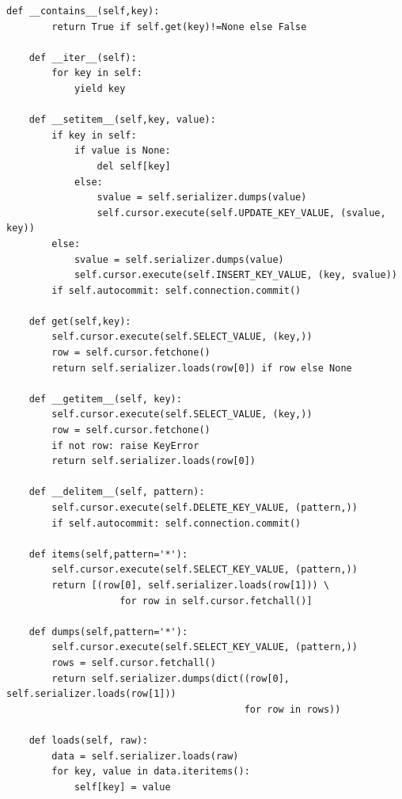 \documentclass[justified,sixbynine]{tufte-book}
\def\ft{\small\tt}
\theoremstyle{plain}%
\theoremstyle{definition}
\theoremstyle{remark}
\begin{document}
\begin{fullwidth}
\begin{lstlisting}[caption={in file: {\ft nlib.py}}]
    def __contains__(self,key):
        return True if self.get(key)!=None else False

    def __iter__(self):
        for key in self:
            yield key

    def __setitem__(self,key, value):
        if key in self:
            if value is None:
                del self[key]
            else:
                svalue = self.serializer.dumps(value)
                self.cursor.execute(self.UPDATE_KEY_VALUE, (svalue, key))
        else:
            svalue = self.serializer.dumps(value)
            self.cursor.execute(self.INSERT_KEY_VALUE, (key, svalue))
        if self.autocommit: self.connection.commit()

    def get(self,key):
        self.cursor.execute(self.SELECT_VALUE, (key,))
        row = self.cursor.fetchone()
        return self.serializer.loads(row[0]) if row else None

    def __getitem__(self, key):
        self.cursor.execute(self.SELECT_VALUE, (key,))
        row = self.cursor.fetchone()
        if not row: raise KeyError
        return self.serializer.loads(row[0])

    def __delitem__(self, pattern):
        self.cursor.execute(self.DELETE_KEY_VALUE, (pattern,))
        if self.autocommit: self.connection.commit()

    def items(self,pattern='*'):
        self.cursor.execute(self.SELECT_KEY_VALUE, (pattern,))
        return [(row[0], self.serializer.loads(row[1])) \
                    for row in self.cursor.fetchall()]

    def dumps(self,pattern='*'):
        self.cursor.execute(self.SELECT_KEY_VALUE, (pattern,))
        rows = self.cursor.fetchall()
        return self.serializer.dumps(dict((row[0], self.serializer.loads(row[1])) 
                                          for row in rows))
            
    def loads(self, raw):
        data = self.serializer.loads(raw)
        for key, value in data.iteritems():
            self[key] = value
\end{lstlisting}


\end{fullwidth}
\end{document}
